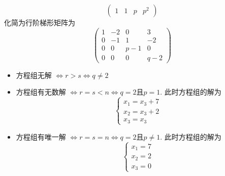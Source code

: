 \documentclass{article}
\begin{document}
\begin{itemize}
$$\begin{pmatrix}
        1 & 1 & p & p^2
    \end{pmatrix}
    $$
    化简为行阶梯形矩阵为
    $$
    \begin{pmatrix}
        1 & -2 & 0 & 3 \\
        0 & -1 & 1 & -2 \\
        0 & 0 & p - 1 & 0 \\
        0 & 0 & 0 & q - 2
        \end{pmatrix}
    $$
    \begin{itemize}
        \item 方程组无解 $\Leftrightarrow r > s \Leftrightarrow q \neq 2$
        \item 方程组有无数解 $\Leftrightarrow r = s < n \Leftrightarrow q = 2 \text{且} p = 1$.
            此时方程组的解为
            $$\begin{cases}
                x_1 = x_3 + 7 \\
                x_2 = x_3 + 2 \\
                x_3 = x_3
            \end{cases}
            $$
        \item 方程组有唯一解 $\Leftrightarrow r = s = n \Leftrightarrow q = 2 \text{且} p \neq 1 $.
            此时方程组的解为
            $$
            \begin{cases}
                x_1 = 7 \\
                x_2 = 2 \\
                x_3 = 0
            \end{cases}
            $$
    \end{itemize}


\end{itemize}
\end{document}
